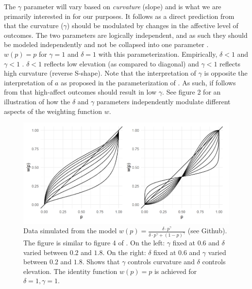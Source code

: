 \documentclass[12pt]{article}
\begin{document}
\vspace{3mm}

The $\gamma$ parameter will vary based on
\emph{curvature} (slope)
\autocite{gonzalez1999shape} and is what we
are primarily interested in for our purposes.
It follows as a direct prediction from
\textcite{rottenstreich2001money} that the
curvature ($\gamma$) should be modulated by changes in
the affective level of outcomes.
The two parameters are logically independent,
and as such they should be modeled
independently and not be collapsed into one
parameter \autocite{abdellaoui2010separating,
gonzalez1999shape}. \\

$w(p) = p$ for  $\gamma = 1$ and $\delta = 1$
with this parameterization. Empirically,
$\delta < 1$ and $\gamma < 1$
\autocite{gonzalez1999shape}. $\delta < 1$
reflects low elevation (as compared to diagonal)
and  $\gamma < 1$ reflects high curvature
(reverse S-shape). Note that the interpretation
of $\gamma$ is opposite the interpretation of
$a$ as proposed in the parameterization of
\textcite{rottenstreich2001money}. As such,
if follows from \textcite{rottenstreich2001money}
that high-affect outcomes should result in low
$\gamma$.
See figure 2 for an
illustration of how the $\delta$
and $\gamma$ parameters independently modulate
different aspects of the weighting function $w$.

\begin{figure}[H]
	\includegraphics[width = \linewidth]{../Figures/Fig2.png}
	\caption{Data simulated from the model
		$w(p) = \frac{\delta \cdot p^{\gamma}}
	{\delta \cdot p^{\gamma} +
	(1-p)^{\gamma}}$ (see Github). The figure
	is similar to figure 4
	of \textcite{gonzalez1999shape}.
	On the left: $\gamma$ fixed at $0.6$
	and $\delta$ varied between $0.2$ and $1.8$.
	On the right: $\delta$ fixed at $0.6$
	and $\gamma$ varied between $0.2$ and $1.8$.
	Shows that $\gamma$  controls
	curvature and $\delta$ controls
	elevation. The identity function $w(p) = p$
	is achieved for $\delta = 1, \gamma = 1$.}
\end{figure}
\end{document}
